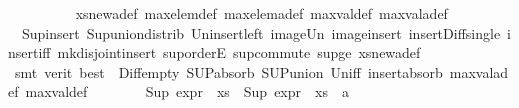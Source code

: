 \begin{isabellebody}
\ \ \ \ \ \ \ \ \isamarkupfalse%
\ xs{\isacharunderscore}{\kern0pt}new{\isacharunderscore}{\kern0pt}a{\isacharunderscore}{\kern0pt}def\ max{\isacharunderscore}{\kern0pt}elem{\isacharunderscore}{\kern0pt}def\ max{\isacharunderscore}{\kern0pt}elem{\isacharunderscore}{\kern0pt}a{\isacharunderscore}{\kern0pt}def\ max{\isacharunderscore}{\kern0pt}val{\isacharunderscore}{\kern0pt}def\ max{\isacharunderscore}{\kern0pt}val{\isacharunderscore}{\kern0pt}a{\isacharunderscore}{\kern0pt}def\isanewline
\ \ \ \ \ \ \ \ \isamarkupfalse%
\ {\isachardoublequoteopen}{}{\isachardoublequoteclose}\ Sup{\isacharunderscore}{\kern0pt}insert\ Sup{\isacharunderscore}{\kern0pt}union{\isacharunderscore}{\kern0pt}distrib\ Un{\isacharunderscore}{\kern0pt}insert{\isacharunderscore}{\kern0pt}left\ image{\isacharunderscore}{\kern0pt}Un\ image{\isacharunderscore}{\kern0pt}insert\ insert{\isacharunderscore}{\kern0pt}Diff{\isacharunderscore}{\kern0pt}single\ insert{\isacharunderscore}{\kern0pt}iff\ mk{\isacharunderscore}{\kern0pt}disjoint{\isacharunderscore}{\kern0pt}insert\ sup{\isachardot}{\kern0pt}orderE\ sup{\isacharunderscore}{\kern0pt}commute\ sup{\isacharunderscore}{\kern0pt}ge{}\ xs{\isacharunderscore}{\kern0pt}new{\isacharunderscore}{\kern0pt}a{\isacharunderscore}{\kern0pt}def\isanewline
\ \ \ \ \ \ \ \ \isamarkupfalse%
\ {\isacharparenleft}{\kern0pt}smt\ {\isacharparenleft}{\kern0pt}verit{\isacharcomma}{\kern0pt}\ best{\isacharparenright}{\kern0pt}\ {\isachardoublequoteopen}{}{\isachardoublequoteclose}\ Diff{\isacharunderscore}{\kern0pt}empty\ SUP{\isacharunderscore}{\kern0pt}absorb\ SUP{\isacharunderscore}{\kern0pt}union\ Un{\isacharunderscore}{\kern0pt}iff\ insert{\isacharunderscore}{\kern0pt}absorb\ max{\isacharunderscore}{\kern0pt}val{\isacharunderscore}{\kern0pt}a{\isacharunderscore}{\kern0pt}def\ max{\isacharunderscore}{\kern0pt}val{\isacharunderscore}{\kern0pt}def{\isacharparenright}{\kern0pt}\isanewline
\ \ \ \ \ \ \isamarkupfalse%
\ {\isachardoublequoteopen}Sup\ {\isacharparenleft}{\kern0pt}expr{\isacharunderscore}{\kern0pt}{}\ {\isacharbackquote}{\kern0pt}\ xs{\isacharparenright}{\kern0pt}\ {\isasymle}\ Sup\ {\isacharparenleft}{\kern0pt}expr{\isacharunderscore}{\kern0pt}{}\ {\isacharbackquote}{\kern0pt}\ {\isacharparenleft}{\kern0pt}xs\ {\isasymunion}\ {\isacharbraceleft}{\kern0pt}a{\isacharbraceright}{\kern0pt}{\isacharparenright}{\kern0pt}{\isacharparenright}{\kern0pt}{\isachardoublequoteclose}\ \isanewline
\ \ \ \ \ \ \ \ \isamarkupfalse%

\end{isabellebody}
